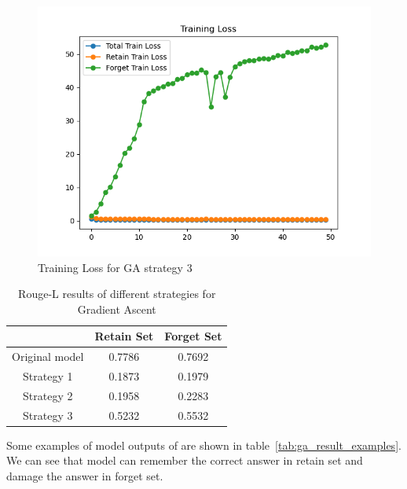 \documentclass[11pt]{article}
\begin{document}
    \begin{figure}
        \centering
        \includegraphics[width=0.9\linewidth]{plot/ga_strategy_3dynamic.png}
        \caption{Training Loss for GA strategy 3}
        \label{fig:result_ga_strategy_3}
    \end{figure}

    \begin{table}[!h]
        \centering
        \begin{tabular}{c|c|c}
            \toprule
            & Retain Set & Forget Set \\
            \midrule
            Original model & 0.7786     & 0.7692     \\
            Strategy 1     & 0.1873     & 0.1979     \\
            Strategy 2     & 0.1958     & 0.2283     \\
            Strategy 3     & 0.5232     & 0.5532     \\
            \bottomrule
        \end{tabular}
        \caption{Rouge-L results of different strategies for Gradient Ascent}
        \label{tab:results_ga}
    \end{table}

    Some examples of model outputs of are shown in table~\ref{tab:ga_result_examples}. We can see that model can remember the correct answer in retain set and damage the answer in forget set.
\end{document}
